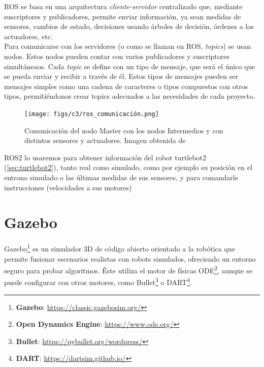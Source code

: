 ROS se basa en una arquitectura \textit{cliente-servidor} centralizado que, mediante suscriptores y publicadores, permite enviar información, ya sean medidas de sensores, cambios de estado, decisiones usando árboles de decisión, órdenes a los actuadores, etc.\\

Para comunicarse con los servidores (o como se llaman en ROS, \textit{topics}) se usan nodos. Estos nodos pueden contar con varios publicadores y suscriptores simultáneaos.
Cada \textit{topic} se define con un tipo de mensaje, que será el único que se pueda enviar y recibir a través de él. Estos tipos de mensajes pueden ser mensajes simples como una cadena de caracteres o tipos compuestos con otros tipos, permitiéndonos crear topics adecuados a las necesidades de cada proyecto.\\

\begin{figure} [H]
    \begin{center}
        \texttt{[image: figs/c3/ros\_comunicación.png]}
    \end{center}
    \caption[Comunicación del nodo Master con los nodos Intermedios y con distintos sensores y actuadores.]{Comunicación del nodo Master con los nodos Intermedios y con distintos sensores y actuadores. Imagen obtenida de \cite{comunicacion_ros2}}
    \label{fig:ros_master_comunicacion}
\end{figure}

ROS2 lo usaremos para obtener información del robot turtlebot2 (\ref{sec:turtlebot2}), tanto real como simulado, como por ejemplo su posición en el entrono simulado o las últimas medidas de sus sensores, y para comandarle instrucciones (velocidades a sus motores)

\section{Gazebo}
\label{sec:gazebo}

Gazebo\footnote{\textbf{Gazebo}: \url{https://classic.gazebosim.org/}} es un simulador 3D de código abierto orientado a la robótica que permite fusionar escenarios realistas con robots simulados, ofreciendo un entorno seguro para probar algoritmos. Éste utiliza el motor de físicas ODE\footnote{\textbf{Open Dynamics Engine}: \url{https://www.ode.org/}}, aunque se puede configurar con otros motores, como Bullet\footnote{\textbf{Bullet}: \url{https://pybullet.org/wordpress/}} o DART\footnote{\textbf{DART}: \url{https://dartsim.github.io/}}.\\

